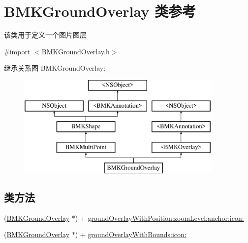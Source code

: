 \hypertarget{interface_b_m_k_ground_overlay}{\section{B\-M\-K\-Ground\-Overlay 类参考}
\label{interface_b_m_k_ground_overlay}
}


该类用于定义一个图片图层  




{\ttfamily \#import $<$B\-M\-K\-Ground\-Overlay.\-h$>$}

继承关系图 B\-M\-K\-Ground\-Overlay\-:\begin{figure}[H]
\begin{center}
\leavevmode
\includegraphics[height=5.000000cm]{interface_b_m_k_ground_overlay}
\end{center}
\end{figure}
\subsection*{类方法}
\begin{DoxyCompactItemize}
\item 
(\hyperlink{interface_b_m_k_ground_overlay}{B\-M\-K\-Ground\-Overlay} $\ast$) + \hyperlink{interface_b_m_k_ground_overlay_a5c11881ef11601df44f714e321485d9e}{ground\-Overlay\-With\-Position\-:zoom\-Level\-:anchor\-:icon\-:}
\item 
(\hyperlink{interface_b_m_k_ground_overlay}{B\-M\-K\-Ground\-Overlay} $\ast$) + \hyperlink{interface_b_m_k_ground_overlay_a2b0872943e563bd7f8994cfca5841097}{ground\-Overlay\-With\-Bounds\-:icon\-:}
\end{DoxyCompactItemize}
